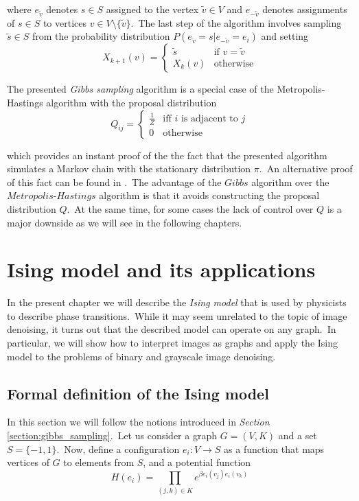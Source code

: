 \documentclass[a4paper, 11pt, onecolumn, openany, titlepage]{report}
\newcommand\numberedchapter[1]{\setlength\topskip{3cm}\chapter{#1}\setlength\topskip{0cm}}
\theoremstyle{default_theorem_style}\newtheorem{theorem}{Theorem}
\theoremstyle{default_theorem_style}\newtheorem{definition}{Definition}
\begin{document}
where $e_{\tilde{v}}$ denotes $s \in S$ assigned to the vertex $\tilde{v} \in V$ and $e_{-\tilde{v}}$
denotes assignments of $s \in S$ to vertices $v \in V \setminus \{\tilde{v}\}$.\ The last step of the algorithm
involves sampling $\tilde{s} \in S$ from the probability distribution $P(e_{\tilde{v}} = s | e_{-\tilde{v}} = e_i)$
and setting
$$
X_{k + 1}(v) =
\begin{cases}
  \tilde{s} &\text{if $v = \tilde{v}$}\\
  X_k(v) &\text{otherwise}
\end{cases}
$$

The presented \textit{Gibbs sampling} algorithm is a special case of the Metropolis-Hastings algorithm with the
proposal distribution
$$
Q_{ij} =
\begin{cases}
  \frac{1}{Z} &\text{iff $i$ is adjacent to $j$}\\
  0 &\text{otherwise}
\end{cases}
$$

which provides an instant proof of the the fact that the presented algorithm simulates a Markov chain with the
stationary distribution $\pi$.\ An alternative proof of this fact can be found in \cite{mcmc_book}.\ The advantage of
the $Gibbs$ algorithm over the $Metropolis$-$Hastings$ algorithm is that it avoids constructing  the proposal
distribution $Q$.\ At the same time, for some cases the lack of control over $Q$ is a major downside as we will see
in the following chapters.

\numberedchapter{Ising model and its applications}\label{chapter:ising_model}

In the present chapter we will describe the \textit{Ising model} that is used by physicists to describe phase
transitions.\ While it may seem unrelated to the topic of image denoising, it turns out that the described model
can operate on any graph.\ In particular, we will show how to interpret images as graphs and apply the Ising model to
the problems of binary and grayscale image denoising.

\section{Formal definition of the Ising model}

In this section we will follow the notions introduced in \textit{Section} \ref{section:gibbs_sampling}.\ Let us consider
a graph $G = (V, K)$ and a set $S = \{-1, 1\}$.\ Now, define a configuration $e_i : V \to S$ as a function that
maps vertices of $G$ to elements from $S$, and a potential function
$$
H(e_i) = \prod\limits_{(j, k) \in K} e^{\beta e_i(v_j)e_i(v_k)}
$$
\end{document}
